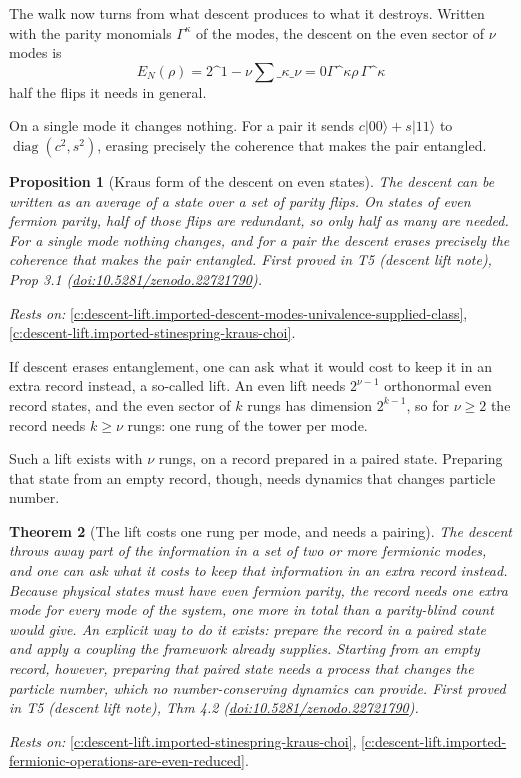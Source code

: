 \documentclass[11pt]{article}
\newtheorem{theorem}{Theorem}[section]
\newtheorem{proposition}[theorem]{Proposition}
\theoremstyle{definition}
\theoremstyle{plain}
\providecommand{\EN}{}\renewcommand{\EN}{E_{N}}
\providecommand{\G}{}\renewcommand{\G}{\Gamma}
\providecommand{\ket}{}\renewcommand{\ket}[1]{|#1\rangle}
\begin{document}
The walk now turns from what descent produces to what it destroys. Written with the parity monomials $\G^{\kappa}$ of the modes, the descent on the even sector of $\nu$ modes is \[ \EN(\rho) = 2\^{}{1-\nu}\sum\_{\kappa\_{\nu} = 0}\G\^{}{\kappa}\rho\,\G\^{}{\kappa} \] half the flips it needs in general.

On a single mode it changes nothing. For a pair it sends $c\ket{00} + s\ket{11}$ to $\operatorname{diag}(c^{2}, s^{2})$, erasing precisely the coherence that makes the pair entangled.

\begin{proposition}[Kraus form of the descent on even states]\label{c:descent-lift.kraus-form-descent-even-states}
The descent can be written as an average of a state over a set of parity flips. On states of even fermion parity, half of those flips are redundant, so only half as many are needed. For a single mode nothing changes, and for a pair the descent erases precisely the coherence that makes the pair entangled.
\emph{First proved in} T5 (descent lift note), Prop 3.1 (\href{https://doi.org/10.5281/zenodo.22721790}{doi:10.5281/zenodo.22721790}).
\end{proposition}
\noindent\emph{Rests on:} \ref{c:descent-lift.imported-descent-modes-univalence-supplied-class}, \ref{c:descent-lift.imported-stinespring-kraus-choi}.

If descent erases entanglement, one can ask what it would cost to keep it in an extra record instead, a so-called lift. An even lift needs $2^{\nu-1}$ orthonormal even record states, and the even sector of $k$ rungs has dimension $2^{k-1}$, so for $\nu \geq 2$ the record needs $k \geq \nu$ rungs: one rung of the tower per mode.

Such a lift exists with $\nu$ rungs, on a record prepared in a paired state. Preparing that state from an empty record, though, needs dynamics that changes particle number.

\begin{theorem}[The lift costs one rung per mode, and needs a pairing]\label{c:descent-lift.lift-costs-one-rung-per-mode}
The descent throws away part of the information in a set of two or more fermionic modes, and one can ask what it costs to keep that information in an extra record instead. Because physical states must have even fermion parity, the record needs one extra mode for every mode of the system, one more in total than a parity-blind count would give. An explicit way to do it exists: prepare the record in a paired state and apply a coupling the framework already supplies. Starting from an empty record, however, preparing that paired state needs a process that changes the particle number, which no number-conserving dynamics can provide.
\emph{First proved in} T5 (descent lift note), Thm 4.2 (\href{https://doi.org/10.5281/zenodo.22721790}{doi:10.5281/zenodo.22721790}).
\end{theorem}
\noindent\emph{Rests on:} \ref{c:descent-lift.imported-stinespring-kraus-choi}, \ref{c:descent-lift.imported-fermionic-operations-are-even-reduced}.
\end{document}
